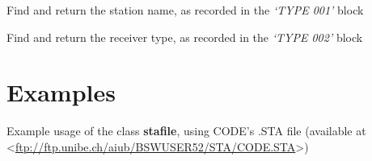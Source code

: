 \documentclass[letterpaper,10pt,english]{sphinxmanual}
\begin{document}
\begin{fulllineitems}
\begin{fulllineitems}
\label{bsta:bsta.stafile.getStationName}
Find and return the station name, as recorded in the \emph{`TYPE 001'}
block

\end{fulllineitems}


\begin{fulllineitems}
\label{bsta:bsta.stafile.getStationReceiver}
Find and return the receiver type, as recorded in the \emph{`TYPE 002'}
block

\end{fulllineitems}


\end{fulllineitems}



\section{Examples}
\label{bsta:examples}
Example usage of the class \textbf{stafile}, using CODE's .STA file
(available at \textless{}\href{ftp://ftp.unibe.ch/aiub/BSWUSER52/STA/CODE.STA}{ftp://ftp.unibe.ch/aiub/BSWUSER52/STA/CODE.STA}\textgreater{})
\end{document}
